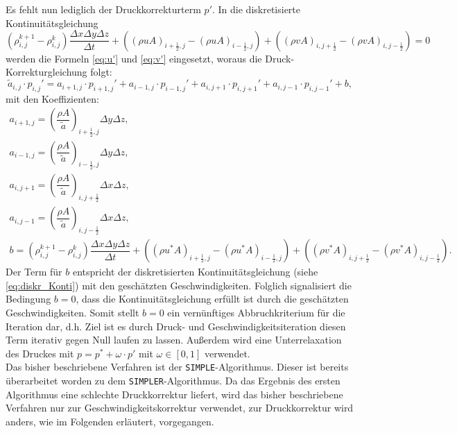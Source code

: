 Es fehlt nun lediglich der Druckkorrekturterm $p'$. In die diskretisierte Kontinuit\"atsgleichung 
\begin{equation} \label{eq:diskr_Konti}
\left(\rho_{i,j}^{k+1}-\rho_{i,j}^{k}\right)\dfrac{\Delta x\Delta y\Delta z}{\Delta t} + \left(\left(\rho u A\right)_{i+\frac{1}{2},j}-\left(\rho u A\right)_{i-\frac{1}{2},j}\right) + \left(\left(\rho v A\right)_{i,j+\frac{1}{2}}-\left(\rho v A\right)_{i,j-\frac{1}{2}}\right)=0
\end{equation}
werden die Formeln \eqref{eq:u'} und \eqref{eq:v'} eingesetzt, woraus die Druck-Korrekturgleichung folgt:
\begin{equation} \label{eq:druckkorrekturglg}
\tilde{a}_{i,j}\cdot p_{i,j}' = a_{i+1,j}\cdot p_{i+1,j}'+a_{i-1,j}\cdot p_{i-1,j}'+a_{i,j+1}\cdot p_{i,j+1}'+a_{i,j-1}\cdot p_{i,j-1}'+b,
\end{equation}
mit den Koeffizienten:
\begin{align}
a_{i+1,j}=\left(\dfrac{\rho A}{\tilde{a}}\right)_{i+\frac{1}{2},j}\Delta y\Delta z, \\
a_{i-1,j}=\left(\dfrac{\rho A}{\tilde{a}}\right)_{i-\frac{1}{2},j}\Delta y\Delta z, \\
a_{i,j+1}=\left(\dfrac{\rho A}{\tilde{a}}\right)_{i,j+\frac{1}{2}}\Delta x\Delta z, \\
a_{i,j-1}=\left(\dfrac{\rho A}{\tilde{a}}\right)_{i,j-\frac{1}{2}}\Delta x\Delta z, \\
b = \left(\rho_{i,j}^{k+1}-\rho_{i,j}^{k}\right)\dfrac{\Delta x\Delta y\Delta z}{\Delta t} + \left(\left(\rho u^{*} A\right)_{i+\frac{1}{2},j}-\left(\rho u^{*} A\right)_{i-\frac{1}{2},j}\right) + \left(\left(\rho v^{*} A\right)_{i,j+\frac{1}{2}}-\left(\rho v^{*} A\right)_{i,j-\frac{1}{2}}\right). \label{eq:b}
\end{align}
Der Term f\"ur $b$ entspricht der diskretisierten Kontinuit\"atsgleichung (siehe \eqref{eq:diskr_Konti}) mit den gesch\"atzten Geschwindigkeiten. Folglich signalisiert die Bedingung $b=0$, dass die Kontinuit\"atsgleichung erf\"ullt ist durch die gesch\"atzten Geschwindigkeiten. Somit stellt $b=0$ ein vern\"unftiges Abbruchkriterium f\"ur die Iteration dar, d.h. Ziel ist es durch Druck- und Geschwindigkeitsiteration diesen Term iterativ gegen Null laufen zu lassen. Au\ss{}erdem wird eine Unterrelaxation des Druckes mit $p=p^{*}+\omega\cdot p'$ mit $\omega\in[0,1]$ verwendet. \\
Das bisher beschriebene Verfahren ist der \texttt{SIMPLE}-Algorithmus. Dieser ist bereits \"uberarbeitet worden zu dem \texttt{SIMPLER}-Algorithmus. Da das Ergebnis des ersten Algorithmus eine schlechte Druckkorrektur liefert, wird das bisher beschriebene Verfahren nur zur Geschwindigkeitskorrektur verwendet, zur Druckkorrektur wird anders, wie im Folgenden erl\"autert, vorgegangen. \\
